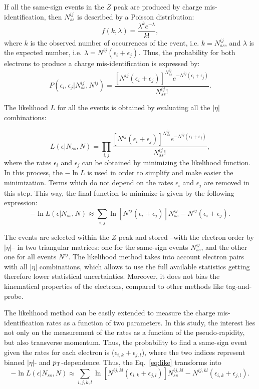 If all the same-sign events in the $Z$ peak are produced by charge mis-identification, then $N^{ij}_{ss}$ is described by a Poisson distribution:
\begin{equation}
f(k,\lambda)=\frac{\lambda^k e^{-\lambda}}{k!},
\end{equation}
where $k$ is the observed number of occurrences of the event, i.e. $k=N^{ij}_{ss}$, and $\lambda$ is the expected number,  i.e. $\lambda=N^{ij}(\epsilon_i+\epsilon_j)$. Thus, the probability for both electrons to produce a charge mis-identification is expressed by:
\begin{equation}
P(\epsilon_i,\epsilon_j|N^{ij}_{ss},N^{ij})=\frac{[N^{ij}(\epsilon_i+\epsilon_j)]^{N_{ss}^{ij}}e^{-N^{ij}(\epsilon_i+\epsilon_j)}}{N^{ij}_{ss}!}.
\end{equation}

The likelihood $L$ for all the events is obtained by evaluating all the $|\eta|$ combinations:

\begin{equation}
L(\epsilon|N_{ss},N)=\prod_{i,j}\frac{[N^{ij}(\epsilon_i+\epsilon_j)]^{N_{ss}^{ij}}e^{-N^{ij}(\epsilon_i+\epsilon_j)}}{N^{ij}_{ss}!},
\end{equation}
where the rates $\epsilon_i$ and $\epsilon_j$ can be obtained by minimizing the likelihood function. In this process, the $-\ln L$ is used in order to simplify and make easier the minimization. Terms which do not depend on the rates $\epsilon_i$ and $\epsilon_j$ are removed in this step. This way, the final function to minimize is given by the following expression:
\begin{equation}
\label{eq:like}
-\ln L(\epsilon|N_{ss},N)\approx \sum_{i,j}\ln[N^{ij}(\epsilon_i+\epsilon_j)]N^{ij}_{ss}-N^{ij}(\epsilon_i+\epsilon_j).
\end{equation}

The events are selected within the $Z$ peak and stored --with the electron order by $|\eta|$-- in two triangular matrices: one for the same-sign events $N^{ij}_{ss}$,  and the other one for all events $N^{ij}$. The likelihood method takes into account
electron pairs with all $|\eta|$ combinations, which allows to use the full available statistics  getting therefore lower statistical uncertainties. Moreover, it does not bias the kinematical properties of the
electrons, compared to other methods like tag-and-probe.

The likelihood  method can be easily extended to measure the charge mis-identification rates as a function of  two parameters. In this study, the interest lies not only on the measurement of the rates   as a function of the pseudo-rapidity, but also transverse momentum. Thus, the probability to find a same-sign event given the rates for each electron is ($\epsilon_{i,k}+\epsilon_{j,l}$), where the two indices represent binned $|\eta|$- and $p_{\rm T}$-dependence. Thus, the Eq.~\ref{eq:like} transforms into
\begin{equation}
-\ln L(\epsilon|N_{ss},N)\approx \sum_{i,j,k,l}\ln[N^{ij,kl}(\epsilon_{i,k}+\epsilon_{j,l})]N^{ij,kl}_{ss}-N^{ij,kl}(\epsilon_{i,k}+\epsilon_{j,l}).
\end{equation}   

